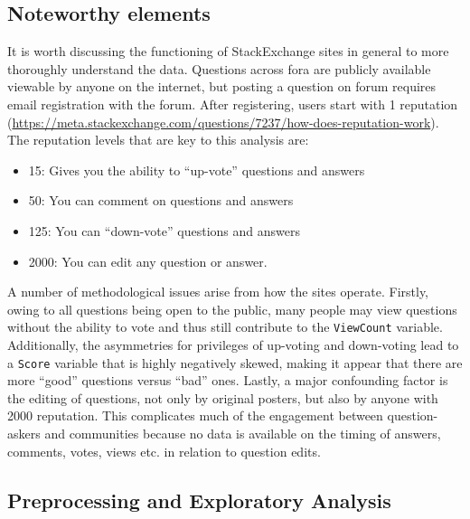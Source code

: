 \documentclass[11pt,preprint, authoryear]{article}
\numberwithin{equation}{section}
\numberwithin{figure}{section}
\numberwithin{table}{section}
\begin{document}
\subsection{\texorpdfstring{Noteworthy elements
\label{noteworthy}}{Noteworthy elements }}\label{noteworthy-elements}

It is worth discussing the functioning of StackExchange sites in general
to more thoroughly understand the data. Questions across fora are
publicly available viewable by anyone on the internet, but posting a
question on forum requires email registration with the forum. After
registering, users start with 1 reputation
(\url{https://meta.stackexchange.com/questions/7237/how-does-reputation-work}).
The reputation levels that are key to this analysis are:


\begin{itemize}
\item
  15: Gives you the ability to ``up-vote'' questions and answers
\item
  50: You can comment on questions and answers
\item
  125: You can ``down-vote'' questions and answers
\item
  2000: You can edit any question or answer.
\end{itemize}


A number of methodological issues arise from how the sites operate.
Firstly, owing to all questions being open to the public, many people
may view questions without the ability to vote and thus still contribute
to the \texttt{ViewCount} variable. Additionally, the asymmetries for
privileges of up-voting and down-voting lead to a \texttt{Score}
variable that is highly negatively skewed, making it appear that there
are more ``good'' questions versus ``bad'' ones. Lastly, a major
confounding factor is the editing of questions, not only by original
posters, but also by anyone with 2000 reputation. This complicates much
of the engagement between question-askers and communities because no
data is available on the timing of answers, comments, votes, views etc.
in relation to question edits.

\subsection{Preprocessing and Exploratory
Analysis}\label{preprocessing-and-exploratory-analysis}
\end{document}
